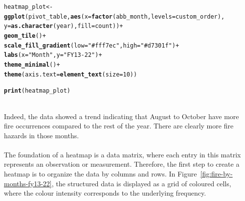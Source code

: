 \documentclass{article}\usepackage[]{graphicx}\usepackage[]{xcolor}
\makeatletter
\newcommand{\hlnum}[1]{\textcolor[rgb]{0.686,0.059,0.569}{#1}}%
\newcommand{\hlstr}[1]{\textcolor[rgb]{0.192,0.494,0.8}{#1}}%
\newcommand{\hlopt}[1]{\textcolor[rgb]{0,0,0}{#1}}%
\newcommand{\hlstd}[1]{\textcolor[rgb]{0.345,0.345,0.345}{#1}}%
\newcommand{\hlkwb}[1]{\textcolor[rgb]{0.69,0.353,0.396}{#1}}%
\newcommand{\hlkwc}[1]{\textcolor[rgb]{0.333,0.667,0.333}{#1}}%
\newcommand{\hlkwd}[1]{\textcolor[rgb]{0.737,0.353,0.396}{\textbf{#1}}}%
\newenvironment{kframe}{%
 \def\at@end@of@kframe{}%
 \ifinner\ifhmode%
  \def\at@end@of@kframe{\end{minipage}}%
  \begin{minipage}{\columnwidth}%
 \fi\fi%
 \def\FrameCommand##1{\hskip\@totalleftmargin \hskip-\fboxsep
 \colorbox{shadecolor}{##1}\hskip-\fboxsep
     \hskip-\linewidth \hskip-\@totalleftmargin \hskip\columnwidth}%
 \MakeFramed {\advance\hsize-\width
   \@totalleftmargin\z@ \linewidth\hsize
   \@setminipage}}%
 {\par\unskip\endMakeFramed%
 \at@end@of@kframe}
\newenvironment{knitrout}{}{} %
\makeatother
\begin{document}
\begin{knitrout}
\color{fgcolor}\begin{kframe}
\begin{alltt}
\hlstd{heatmap_plot} \hlkwb{<-} \hlkwd{ggplot}\hlstd{(pivot_table,} \hlkwd{aes}\hlstd{(}\hlkwc{x} \hlstd{=} \hlkwd{factor}\hlstd{(abb_month,} \hlkwc{levels} \hlstd{= custom_order),}
                                        \hlkwc{y} \hlstd{=} \hlkwd{as.character}\hlstd{(year),} \hlkwc{fill} \hlstd{= count))} \hlopt{+}
  \hlkwd{geom_tile}\hlstd{()} \hlopt{+}
  \hlkwd{scale_fill_gradient}\hlstd{(}\hlkwc{low} \hlstd{=} \hlstr{"#fff7ec"}\hlstd{,} \hlkwc{high} \hlstd{=} \hlstr{"#d7301f"}\hlstd{)} \hlopt{+}
  \hlkwd{labs}\hlstd{(}\hlkwc{x} \hlstd{=} \hlstr{"Month"}\hlstd{,} \hlkwc{y} \hlstd{=} \hlstr{"FY13-22"}\hlstd{)} \hlopt{+}
  \hlkwd{theme_minimal}\hlstd{()} \hlopt{+}
  \hlkwd{theme}\hlstd{(}\hlkwc{axis.text} \hlstd{=} \hlkwd{element_text}\hlstd{(}\hlkwc{size} \hlstd{=} \hlnum{10}\hlstd{))}
\end{alltt}


{\ttfamily\noindent\bfseries\color{errorcolor}{\#\# Error in ggplot(pivot\_table, aes(x = factor(abb\_month, levels = custom\_order), : object 'pivot\_table' not found}}\begin{alltt}
\hlkwd{print}\hlstd{(heatmap_plot)}
\end{alltt}


{\ttfamily\noindent\bfseries\color{errorcolor}{\#\# Error in print(heatmap\_plot): object 'heatmap\_plot' not found}}\end{kframe}
\end{knitrout}
\\Indeed, the data showed a trend indicating that August to October have more fire occurrences compared to the rest of the year. There are clearly more fire hazards in those months.
\\  
\\The foundation of a heatmap is a data matrix, where each entry in this matrix represents an observation or measurement. Therefore, the first step to create a heatmap is to organize the data by columns and rows. In Figure~\ref{fig:fire-by-months-fy13-22}, the structured data is displayed as a grid of coloured cells, where the colour intensity corresponds to the underlying frequency.
\\  
\end{document}
